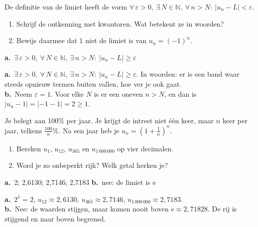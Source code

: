 \begin{oefeningen}
\begin{oefening}[3]
 De definitie van de limiet heeft de vorm $\forall\, \varepsilon > 0,\ \exists\, N \in \mathbb{N},\ \forall\, n > N: \ |u_n - L| < \varepsilon$.
\begin{enumerate}
  \item Schrijf de ontkenning met kwantoren. Wat betekent ze in woorden?
  \item Bewijs daarmee dat 1 niet de limiet is van $u_n = (-1)^n$.
\end{enumerate}
\begin{solution}
\textbf{a.}~$\exists\,\varepsilon>0,\ \forall\,N\in\mathbb{N},\ \exists\,n>N:\ |u_n-L|\geqslant\varepsilon$
\end{solution}
\begin{fullsolution}
\textbf{a.}~$\exists\,\varepsilon>0,\ \forall\,N\in\mathbb{N},\ \exists\,n>N:\ |u_n-L|\geqslant\varepsilon$. In woorden: er is een band waar steeds opnieuw termen buiten vallen, hoe ver je ook gaat.\\
\textbf{b.}~Neem $\varepsilon=1$. Voor elke $N$ is er een oneven $n>N$, en dan is $|u_n-1|=|-1-1|=2\geqslant 1$.
\end{fullsolution}
\end{oefening}

\begin{oefening}[2]
 Je belegt  aan 100\% per jaar. Je krijgt de intrest niet één keer, maar $n$ keer per jaar, telkens $\tfrac{100}{n}$\%. Na een jaar heb je $u_n = \left(1 + \tfrac1n\right)^n$.
\begin{enumerate}
  \item Bereken $u_1$, $u_{12}$, $u_{365}$ en $u_{1\,000\,000}$ op vier decimalen.
  \item Word je zo onbeperkt rijk? Welk getal herken je?
\end{enumerate}
\begin{solution}
\textbf{a.}~2; 2,6130; 2,7146; 2,7183 \quad \textbf{b.}~nee: de limiet is $\mathrm{e}$
\end{solution}
\begin{fullsolution}
\textbf{a.}~$2^1=2$, $u_{12}\approx 2{,}6130$, $u_{365}\approx 2{,}7146$, $u_{1\,000\,000}\approx 2{,}7183$.\\
\textbf{b.}~Nee: de waarden stijgen, maar komen nooit boven $\mathrm{e}\approx 2{,}71828$. De rij is stijgend en naar boven begrensd.
\end{fullsolution}
\end{oefening}


\end{oefeningen}
